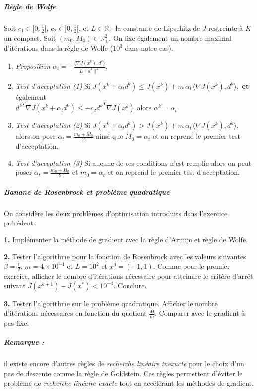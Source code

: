 \documentclass[a4paper,french,12pt]{article}
\begin{document}
\subparagraph{Règle de Wolfe}
Soit $c_1 \in ]0, \frac{1}{2}[$, $c_2 \in ]0,\frac{1}{2}[$, et $L \in \mathbb{R}_+$ la constante de Lipschitz de $J$ restreinte à $K$ un compact. Soit $(m_0,M_0) \in \mathbb{R}_+^2$. On fixe également un nombre maximal d'itérations dans la règle de Wolfe ($10^3$ dans notre cas).
\begin{enumerate}
%
\item \textit{Proposition} 
$\alpha_t = -\frac{\langle \nabla J(x^k),d^k \rangle}{L \|d^k\|^2}$,
\item \textit{Test d'acceptation (1)}
  Si $J(x^k + \alpha_t d^k) \leq J(x^k) 
+ m\, \alpha_t\, \langle \nabla J(x^k),d^k \rangle,
$ \textbf{et} également \\ ${d^k}^T \nabla J(x^k + \alpha_t d^k) \le -c_2 {d^k}^T \nabla J(x^k)$ alors $\alpha^k = \alpha_t$.
\item \textit{Test d'acceptation (2)}
  Si $J(x^k + \alpha_t d^k) > J(x^k) 
+ m\, \alpha_t\, \langle \nabla J(x^k),d^k \rangle,$ alors on pose $\alpha_t = \frac{m_0+M_0}{2}
$ ainsi que $M_0 = \alpha_t$ et on reprend le premier test d'acceptation.
\item \textit{Test d'acceptation (3)} Si aucune de ces conditions n'est remplie alors on peut poser $\alpha_t = \frac{m_0+M_0}{2}$ et $m_0 = \alpha_t$ et on reprend le premier test d'acceptation.
\end{enumerate}


\subparagraph{Banane de Rosenbrock et problème quadratique}On considère les deux problèmes d'optimisation introduits dans l'exercice précédent.

\textbf{1.} Implémenter la méthode de gradient avec la règle d'Armijo et règle de Wolfe.

\textbf{2.} Tester l'algorithme pour la fonction de Rosenbrock avec les valeurs suivantes $\beta = \frac{1}{2}$, $m = 4 \times 10^{-1}$ et $L = 10^2$ et $x^0 = (-1,1)$. Comme pour le premier exercice, afficher le nombre d'itérations nécessaire pour atteindre le critère
d'arrêt suivant $J(x^{k+1})-J(x^*) < 10^{-4}$. Conclure.

\textbf{3.} Tester l'algorithme sur le problème quadratique. Afficher le nombre d'itérations nécessaires en fonction du quotient $\frac{M}{m}$. Comparer avec le gradient à pas fixe.

\subparagraph{Remarque :} il existe encore d'autres règles de \textit{recherche linéaire inexacte} pour le choix d'un pas de descente comme la règle de Goldstein. Ces règles permettent d'éviter le problème de \textit{recherche linéaire exacte} tout en accélérant les méthodes de gradient.
%
\end{document}
